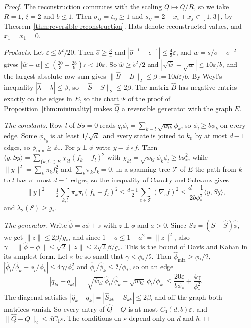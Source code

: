 \begin{proof}
The reconstruction commutes with the scaling $Q\mapsto Q/R$, so we take $R=1$, $\bar\xi=2$ and
$b\le1$. Then $\sigma_{ij}=t_{ij}\ge1$ and $s_{ij}=2-x_i+x_j\in[1,3]$, by
Theorem~\ref{thm:reversible-reconstruction}. Hats denote reconstructed values, and
$\widehat x_1=x_1=0$.

\emph{Products.} Let $\varepsilon\le b^2/20$. Then $\widehat\sigma\ge\frac34$ and
$|\widehat\sigma^{-1}-\sigma^{-1}|\le\frac43\varepsilon$, and $w=s/\sigma+\sigma^{-2}$ gives
$|\widehat w-w|\le(\frac{20}3+\frac{28}9)\varepsilon<10\varepsilon$. So $\widehat w\ge b^2/2$ and
$|\sqrt{\widehat w}-\sqrt w|\le10\varepsilon/b$, and the largest absolute row sum gives
$\|\widehat B-B\|_2\le\beta:=10d\varepsilon/b$. By Weyl's inequality
$|\widehat\lambda-\lambda|\le\beta$, so $\|\widehat S-S\|_2\le2\beta$. The matrix $\widehat B$
has negative entries exactly on the edges in $E$, so the chart $\Psi$ of the proof of
Proposition~\ref{thm:minimality} makes $\widehat Q$ a reversible generator with the graph $E$.

\emph{The constants.} Row $l$ of $S\phi=0$ reads $q_l\phi_l=\sum_{k\sim l}\sqrt{w_{lk}}\phi_k$, so
$\phi_l\ge b\phi_k$ on every edge. Some $\phi_{k_0}$ is at least $1/\sqrt d$, and every state is
joined to $k_0$ by at most $d-1$ edges, so $\phi_{\min}\ge\phi_*$. For $y\perp\phi$ write
$y=\phi\circ f$. Then $\langle y,Sy\rangle=\sum_{\{k,l\}\in E}\chi_{kl}(f_k-f_l)^2$ with
$\chi_{kl}=\sqrt{w_{kl}}\phi_k\phi_l\ge b\phi_*^2$, while $\|y\|^2=\sum_k\pi_kf_k^2$ and
$\sum_k\pi_kf_k=0$. In a spanning tree $\mathcal T$ of $E$ the path from $k$ to $l$ has at most
$d-1$ edges, so the inequality of Cauchy and Schwarz gives
\[
 \|y\|^2=\tfrac12\sum_{k,l}\pi_k\pi_l(f_k-f_l)^2\le\tfrac{d-1}2\sum_{e\in\mathcal T}(\nabla_ef)^2
 \le\frac{d-1}{2b\phi_*^2}\langle y,Sy\rangle,
\]
and $\lambda_2(S)\ge g_*$.

\emph{The generator.} Write $\widehat\phi=a\phi+z$ with $z\perp\phi$ and $a>0$. Since
$Sz=(S-\widehat S)\widehat\phi$, we get $\|z\|\le2\beta/g_*$, and since $1-a\le1-a^2=\|z\|^2$,
also $\gamma=\|\widehat\phi-\phi\|\le\sqrt2\|z\|\le2\sqrt2\beta/g_*$. This is the bound of Davis
and Kahan in its simplest form. Let $\varepsilon$ be so small that $\gamma\le\phi_*/2$. Then
$\widehat\phi_{\min}\ge\phi_*/2$,
$|\widehat\phi_l/\widehat\phi_k-\phi_l/\phi_k|\le4\gamma/\phi_*^2$ and
$\widehat\phi_l/\widehat\phi_k\le2/\phi_*$, so on an edge
\[
 |\widehat q_{kl}-q_{kl}|
 =\bigl|\sqrt{\widehat w_{kl}}\,\widehat\phi_l/\widehat\phi_k-\sqrt{w_{kl}}\,\phi_l/\phi_k\bigr|
 \le\frac{20\varepsilon}{b\phi_*}+\frac{4\gamma}{\phi_*^2}.
\]
The diagonal satisfies $|\widehat q_k-q_k|=|\widehat S_{kk}-S_{kk}|\le2\beta$, and off the graph
both matrices vanish. So every entry of $\widehat Q-Q$ is at most $C_1(d,b)\varepsilon$, and
$\|\widehat Q-Q\|_2\le dC_1\varepsilon$. The conditions on $\varepsilon$ depend only on $d$ and
$b$.
\end{proof}

